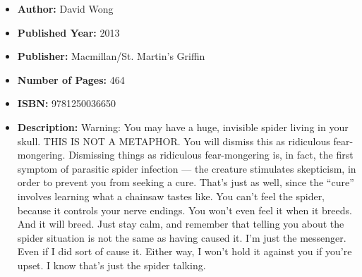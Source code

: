 \documentclass{tufte-handout}
\begin{document}
\begin{itemize}
    \item[] \textbf{Author:} David Wong
    \item[] \textbf{Published Year:} 2013
    \item[] \textbf{Publisher:} Macmillan/St. Martin's Griffin
    \item[] \textbf{Number of Pages:} 464      
    \item[] \textbf{ISBN:} 9781250036650
    \item[] \textbf{Description:} Warning: You may have a huge, invisible spider living in your skull. THIS IS NOT A METAPHOR. You will dismiss this as ridiculous fear-mongering. Dismissing things as ridiculous fear-mongering is, in fact, the first symptom of parasitic spider infection --- the creature stimulates skepticism, in order to prevent you from seeking a cure. That's just as well, since the ``cure'' involves learning what a chainsaw tastes like. You can't feel the spider, because it controls your nerve endings. You won't even feel it when it breeds. And it will breed. Just stay calm, and remember that telling you about the spider situation is not the same as having caused it. I'm just the messenger. Even if I did sort of cause it. Either way, I won't hold it against you if you're upset. I know that's just the spider talking.
\end{itemize}
\end{document}
